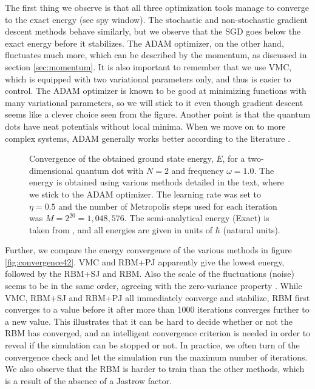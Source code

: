 The first thing we observe is that all three optimization tools manage to converge to the exact energy (see spy window). The stochastic and non-stochastic gradient descent methods behave similarly, but we observe that the SGD goes below the exact energy before it stabilizes. The ADAM optimizer, on the other hand, fluctuates much more, which can be described by the momentum, as discussed in section \ref{sec:momentum}. It is also important to remember that we use VMC, which is equipped with two variational parameters only, and thus is easier to control. The ADAM optimizer is known to be good at minimizing functions with many variational parameters, so we will stick to it even though gradient descent seems like a clever choice seen from the figure. Another point is that the quantum dots have neat potentials without local minima. When we move on to more complex systems, ADAM generally works better according to the literature \supercite{kingma_adam:_2014}.

\begin{figure}
	\centering 
	\subfloat{{}}
	\caption{Convergence of the obtained ground state energy, $E$, for a two-dimensional quantum dot with $N=2$ and frequency $\omega=1.0$. The energy is obtained using various methods detailed in the text, where we stick to the ADAM optimizer. The learning rate was set to $\eta=0.5$ and the number of Metropolis steps used for each iteration was $M=2^{20}=1,048,576$. The semi-analytical energy (Exact) is taken from \citet{taut_two_1993}, and all energies are given in units of $\hbar$ (natural units).}
	\label{fig:convergence42}
\end{figure} 

Further, we compare the energy convergence of the various methods in figure \eqref{fig:convergence42}. VMC and RBM+PJ apparently give the lowest energy, followed by the RBM+SJ and RBM. Also the scale of the fluctuations (noise) seems to be in the same order, agreeing with the zero-variance property \supercite{assaraf_zero-variance_2003}. While VMC, RBM+SJ and RBM+PJ all immediately converge and stabilize, RBM first converges to a value before it after more than 1000 iterations converges further to a new value. This illustrates that it can be hard to decide whether or not the RBM has converged, and an intelligent convergence criterion is needed in order to reveal if the simulation can be stopped or not. In practice, we often turn of the convergence check and let the simulation run the maximum number of iterations. We also observe that the RBM is harder to train than the other methods, which is a result of the absence of a Jastrow factor.

